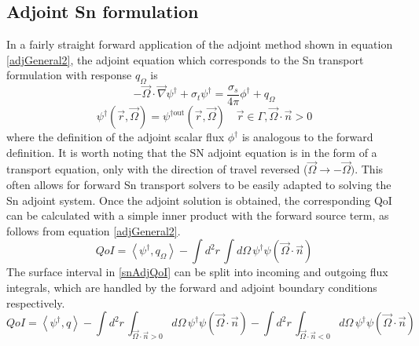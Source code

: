 \documentclass{article}
\newcommand{\vr}{\vec{r}}
\newcommand{\vO}{\vec{\Omega}}
\newcommand{\bra}{\left\langle}
\newcommand{\ket}{\right\rangle}
\newcommand{\vgrad}{\vec{\nabla}}
\newcommand{\sigt}{\sigma_t}
\newcommand{\sigs}{\sigma_s}
\newcommand{\angSource}{q_\Omega}
\begin{document}
\subsection{Adjoint Sn formulation}
In a fairly straight forward application of the adjoint method shown in equation \ref{adjGeneral2}, the adjoint equation which corresponds to the Sn transport formulation with response $\angSource$ is
\begin{equation}
\label{snAdj}
- \vO \cdot \vgrad \psi^\dag + \sigt \psi^\dag = \frac{\sigs}{4 \pi} \phi^\dag + \angSource
\end{equation}
\begin{equation}
\psi^\dag(\vr,\vO) = \psi^{\dag \text{out}}(\vr,\vO) \quad \vr \in \Gamma, \vO \cdot \vec{n} > 0
\end{equation}
where the definition of the adjoint scalar flux $\phi^\dag$ is analogous to the forward definition. It is worth noting that the SN adjoint equation is in the form of a transport equation, only with the direction of travel reversed ($\vO \to -\vO)$. This often allows for forward Sn transport solvers to be easily adapted to solving the Sn adjoint system. Once the adjoint solution is obtained, the corresponding QoI can be calculated with a simple inner product with the forward source term, as follows from equation \ref{adjGeneral2}. 
\begin{equation}
\label{snAdjQoI}
QoI = \bra \psi^\dag , \angSource \ket - \int d^2 r \, \int d  \Omega \, \psi^\dag \psi ( \vO \cdot \vec{n} )
\end{equation}
The surface interval in \ref{snAdjQoI} can be split into incoming and outgoing flux integrals, which are handled by the forward and adjoint boundary conditions respectively. 
\begin{equation}
QoI = \bra \psi^\dag , q \ket - \int d^2 r \, \int_{\vO \cdot \vec{n} >0} d  \Omega \, \psi^\dag \psi ( \vO \cdot \vec{n} ) - \int d^2 r \, \int_{\vO \cdot \vec{n} <0} d  \Omega \, \psi^\dag \psi ( \vO \cdot \vec{n} )
\end{equation}
\end{document}
